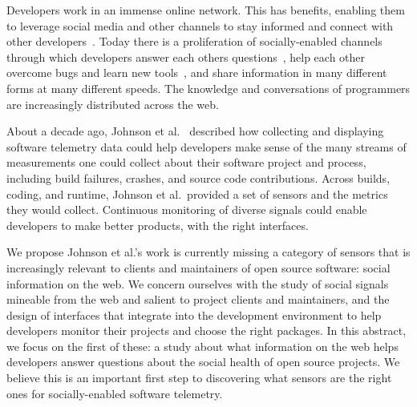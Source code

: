 Developers work in an immense online network.
This has benefits, enabling them to leverage social media and other channels to stay informed and connect with other developers~\cite{singer_software_2014,storey_how_2016}.
Today there is a proliferation of socially-enabled channels~\cite{storey_revolution_2014} through which developers answer each others questions~\cite{mamykina_fastest_2011}, help each other overcome bugs and learn new tools~\cite{parnin_blogging_2013}, and share information in many different forms at many different speeds.
The knowledge and conversations of programmers are increasingly distributed across the web.

About a decade ago, Johnson et al.~\cite{johnson_improving_2005} described how collecting and displaying software telemetry data could help developers make sense of the many streams of measurements one could collect about their software project and process, including build failures, crashes, and source code contributions.
Across builds, coding, and runtime, Johnson et al.\ provided a set of sensors and the metrics they would collect.
Continuous monitoring of diverse signals could enable developers to make better products, with the right interfaces.

We propose Johnson et al.'s work is currently missing a category of sensors that is increasingly relevant to clients and maintainers of open source software:
social information on the web.
We concern ourselves with the study of social signals mineable from the web and salient to project clients and maintainers, and the design of interfaces that integrate into the development environment to help developers monitor their projects and choose the right packages.
In this abstract, we focus on the first of these:
a study about what information on the web helps developers answer questions about the social health of open source projects.
We believe this is an important first step to discovering what sensors are the right ones for socially-enabled software telemetry.

